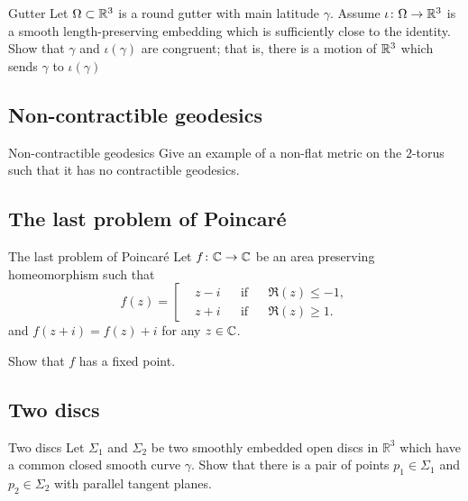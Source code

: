 \begin{pr}{\hard}{Gutter}\label{half-torus}
Let $\Omega\subset \mathbb{R}^3$ is a round gutter with main latitude $\gamma$. 
Assume $\iota\colon\Omega\to\mathbb{R}^3$ 
is a smooth length-preserving embedding which is sufficiently close to the identity.
Show that $\gamma$ and $\iota(\gamma)$ are congruent;
that is, there is a motion of $\mathbb{R}^3$ which sends $\gamma$ to $\iota(\gamma)$
\end{pr}



\subsection*{Non-contractible geodesics}


\begin{pr}{\easy}{Non-contractible geodesics}\label{torus}
Give an example of a non-flat metric 
on the $2$-torus such that it has no contractible geodesics.
\end{pr}

\subsection*{The last problem of Poincar\'e\hard}

\begin{pr}{\hard}{The last problem of Poincar\'e}\label{The last problem of Poincare}
Let $f\colon\mathbb{C}\to \mathbb{C}$ be an area preserving homeomorphism
such that 
\[f(z)
=
\left[
\begin{aligned}
&z-i&&\text{if}&&\Re(z)\le -1,
\\
&z+i&&\text{if}&&\Re(z)\ge 1.
\end{aligned}
\right.
\] 
and $f(z+i)=f(z)+i$ for any $z\in\mathbb{C}$.

Show that $f$ has a fixed point.
\end{pr}

\subsection*{Two discs}

\begin{pr}{}{Two discs}\label{Two discs}
Let $\Sigma_1$ and $\Sigma_2$ be two smoothly embedded open discs in $\mathbb R^3$ 
which have a common closed smooth curve $\gamma$.
Show that there is a pair of points  $p_1\in \Sigma_1$ and $p_2\in \Sigma_2$ with parallel tangent planes.
\end{pr}



